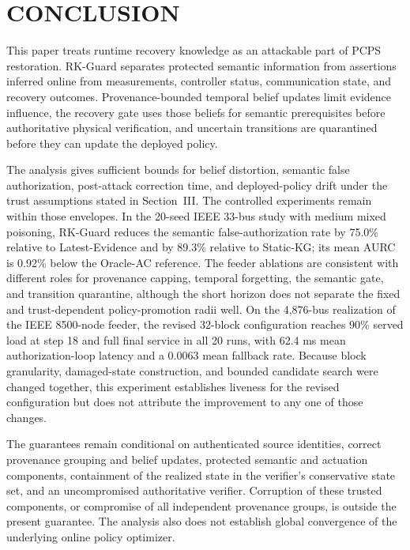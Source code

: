 \section{CONCLUSION}
This paper treats runtime recovery knowledge as an attackable part of PCPS restoration. RK-Guard separates protected semantic information from assertions inferred online from measurements, controller status, communication state, and recovery outcomes. Provenance-bounded temporal belief updates limit evidence influence, the recovery gate uses those beliefs for semantic prerequisites before authoritative physical verification, and uncertain transitions are quarantined before they can update the deployed policy.

The analysis gives sufficient bounds for belief distortion, semantic false authorization, post-attack correction time, and deployed-policy drift under the trust assumptions stated in Section~III. The controlled experiments remain within those envelopes. In the 20-seed IEEE 33-bus study with medium mixed poisoning, RK-Guard reduces the semantic false-authorization rate by 75.0\% relative to Latest-Evidence and by 89.3\% relative to Static-KG; its mean AURC is 0.92\% below the Oracle-AC reference. The feeder ablations are consistent with different roles for provenance capping, temporal forgetting, the semantic gate, and transition quarantine, although the short horizon does not separate the fixed and trust-dependent policy-promotion radii well. On the 4,876-bus realization of the IEEE 8500-node feeder, the revised 32-block configuration reaches 90\% served load at step 18 and full final service in all 20 runs, with 62.4 ms mean authorization-loop latency and a 0.0063 mean fallback rate. Because block granularity, damaged-state construction, and bounded candidate search were changed together, this experiment establishes liveness for the revised configuration but does not attribute the improvement to any one of those changes.

The guarantees remain conditional on authenticated source identities, correct provenance grouping and belief updates, protected semantic and actuation components, containment of the realized state in the verifier's conservative state set, and an uncompromised authoritative verifier. Corruption of these trusted components, or compromise of all independent provenance groups, is outside the present guarantee. The analysis also does not establish global convergence of the underlying online policy optimizer.

